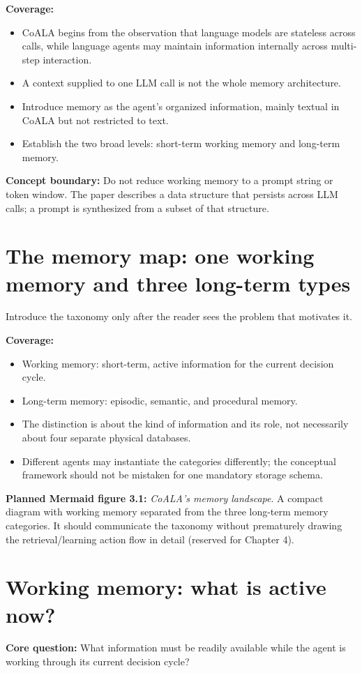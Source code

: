 \textbf{Coverage:}
\begin{itemize}
  \item CoALA begins from the observation that language models are stateless across calls, while language agents may maintain information internally across multi-step interaction.
  \item A context supplied to one LLM call is not the whole memory architecture.
  \item Introduce memory as the agent's organized information, mainly textual in CoALA but not restricted to text.
  \item Establish the two broad levels: short-term working memory and long-term memory.
\end{itemize}

\textbf{Concept boundary:} Do not reduce working memory to a prompt string or token window. The paper describes a data structure that persists across LLM calls; a prompt is synthesized from a subset of that structure. 

\section{The memory map: one working memory and three long-term types}
Introduce the taxonomy only after the reader sees the problem that motivates it.

\textbf{Coverage:}
\begin{itemize}
  \item Working memory: short-term, active information for the current decision cycle.
  \item Long-term memory: episodic, semantic, and procedural memory.
  \item The distinction is about the kind of information and its role, not necessarily about four separate physical databases.
  \item Different agents may instantiate the categories differently; the conceptual framework should not be mistaken for one mandatory storage schema.
\end{itemize}

\textbf{Planned Mermaid figure 3.1:} \emph{CoALA's memory landscape}. A compact diagram with working memory separated from the three long-term memory categories. It should communicate the taxonomy without prematurely drawing the retrieval/learning action flow in detail (reserved for Chapter 4).

\section{Working memory: what is active now?}
\textbf{Core question:} What information must be readily available while the agent is working through its current decision cycle?


